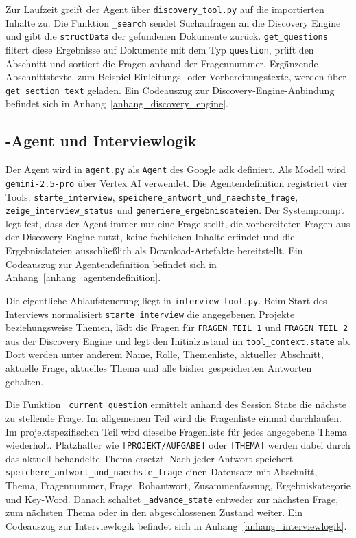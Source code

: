 \documentclass[
  10pt,
  ngerman,
  a4paper,
  toc=graduated,
  numbers=noenddot,
  headings=standardclasses,
  nonumberlist
]{scrartcl}
\newcommand{\code}[1]{\nolinkurl{#1}}
\begin{document}
Zur Laufzeit greift der Agent über \code{discovery\_tool.py} auf die importierten Inhalte zu. Die Funktion \code{\_search} sendet Suchanfragen an die Discovery Engine und gibt die \code{structData} der gefundenen Dokumente zurück. \code{get\_questions} filtert diese Ergebnisse auf Dokumente mit dem Typ \code{question}, prüft den Abschnitt und sortiert die Fragen anhand der Fragennummer. Ergänzende Abschnittstexte, zum Beispiel Einleitungs- oder Vorbereitungstexte, werden über \code{get\_section\_text} geladen. Ein Codeauszug zur Discovery-Engine-Anbindung befindet sich in Anhang~\ref{anhang_discovery_engine}.

\subsection{-Agent und Interviewlogik}
\label{adk_agent_und_interviewlogik}

Der Agent wird in \code{agent.py} als \code{Agent} des Google \gls{adk} definiert. Als Modell wird \code{gemini-2.5-pro} über Vertex AI verwendet. Die Agentendefinition registriert vier Tools: \code{starte\_interview}, \code{speichere\_antwort\_und\_naechste\_frage}, \code{zeige\_interview\_status} und \code{generiere\_ergebnisdateien}. Der Systemprompt legt fest, dass der Agent immer nur eine Frage stellt, die vorbereiteten Fragen aus der Discovery Engine nutzt, keine fachlichen Inhalte erfindet und die Ergebnisdateien ausschließlich als Download-Artefakte bereitstellt. Ein Codeauszug zur Agentendefinition befindet sich in Anhang~\ref{anhang_agentendefinition}.

Die eigentliche Ablaufsteuerung liegt in \code{interview\_tool.py}. Beim Start des Interviews normalisiert \code{starte\_interview} die angegebenen Projekte beziehungsweise Themen, lädt die Fragen für \code{FRAGEN\_TEIL\_1} und \code{FRAGEN\_TEIL\_2} aus der Discovery Engine und legt den Initialzustand im \code{tool\_context.state} ab. Dort werden unter anderem Name, Rolle, Themenliste, aktueller Abschnitt, aktuelle Frage, aktuelles Thema und alle bisher gespeicherten Antworten gehalten.

Die Funktion \code{\_current\_question} ermittelt anhand des Session State die nächste zu stellende Frage. Im allgemeinen Teil wird die Fragenliste einmal durchlaufen. Im projektspezifischen Teil wird dieselbe Fragenliste für jedes angegebene Thema wiederholt. Platzhalter wie \code{[PROJEKT/AUFGABE]} oder \code{[THEMA]} werden dabei durch das aktuell behandelte Thema ersetzt. Nach jeder Antwort speichert \code{speichere\_antwort\_und\_naechste\_frage} einen Datensatz mit Abschnitt, Thema, Fragennummer, Frage, Rohantwort, Zusammenfassung, Ergebniskategorie und Key-Word. Danach schaltet \code{\_advance\_state} entweder zur nächsten Frage, zum nächsten Thema oder in den abgeschlossenen Zustand weiter. Ein Codeauszug zur Interviewlogik befindet sich in Anhang~\ref{anhang_interviewlogik}.
\end{document}
